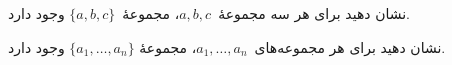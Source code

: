 \documentclass[../../../include/open-logic-section]{subfiles}
\begin{document}
\begin{prob}
نشان دهید برای هر سه مجموعهٔ~$a,b,c$، مجموعهٔ~$\{a,b,c\}$ وجود دارد.
\end{prob}

\begin{prob}
نشان دهید برای هر مجموعه‌های~$a_1,\ldots,a_n$، مجموعهٔ
$\{a_1,\ldots,a_n\}$ وجود دارد.
\end{prob}

\end{document}
